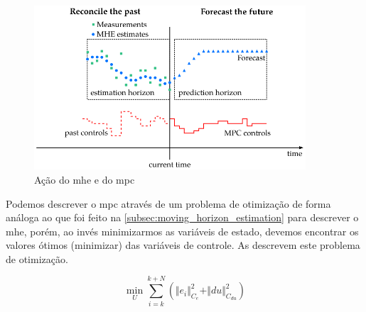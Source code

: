 \begin{figure}
	\begin{center}
		\includegraphics[width=0.9\textwidth]{./5_images/fig_mhe_mpc.png} 
		\caption{Ação do \acrlong{mhe} e do \acrlong{mpc}}
		\label{fig:mhe_mpc}
	\end{center}
\end{figure}

Podemos descrever o \acrshort{mpc} através de um problema de otimização de forma análoga ao que foi feito
na \cref{subsec:moving_horizon_estimation} para descrever o \acrshort{mhe}, porém, ao invés minimizarmos
as variáveis de estado, devemos encontrar os valores ótimos (minimizar) das variáveis de controle.
As  descrevem este problema de otimização.

\begin{equation}
	\label{eq:mpc_minimization}
	\min_{U} \sum_{i=k}^{k+N} ( \Vert e_i \Vert^2_{C_e} + \Vert du \Vert^2_{C_{du}} )
\end{equation}

